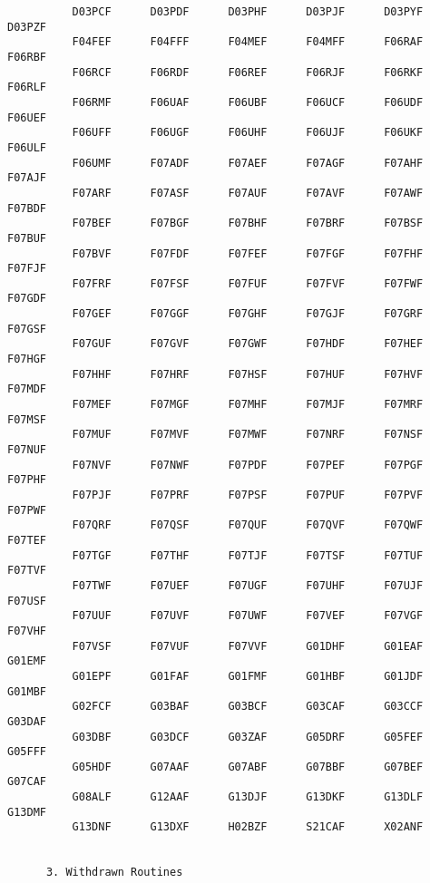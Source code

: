 \begin{small}
\begin{verbatim}
          D03PCF      D03PDF      D03PHF      D03PJF      D03PYF      D03PZF     
          F04FEF      F04FFF      F04MEF      F04MFF      F06RAF      F06RBF     
          F06RCF      F06RDF      F06REF      F06RJF      F06RKF      F06RLF     
          F06RMF      F06UAF      F06UBF      F06UCF      F06UDF      F06UEF     
          F06UFF      F06UGF      F06UHF      F06UJF      F06UKF      F06ULF     
          F06UMF      F07ADF      F07AEF      F07AGF      F07AHF      F07AJF     
          F07ARF      F07ASF      F07AUF      F07AVF      F07AWF      F07BDF     
          F07BEF      F07BGF      F07BHF      F07BRF      F07BSF      F07BUF     
          F07BVF      F07FDF      F07FEF      F07FGF      F07FHF      F07FJF     
          F07FRF      F07FSF      F07FUF      F07FVF      F07FWF      F07GDF     
          F07GEF      F07GGF      F07GHF      F07GJF      F07GRF      F07GSF     
          F07GUF      F07GVF      F07GWF      F07HDF      F07HEF      F07HGF     
          F07HHF      F07HRF      F07HSF      F07HUF      F07HVF      F07MDF     
          F07MEF      F07MGF      F07MHF      F07MJF      F07MRF      F07MSF     
          F07MUF      F07MVF      F07MWF      F07NRF      F07NSF      F07NUF     
          F07NVF      F07NWF      F07PDF      F07PEF      F07PGF      F07PHF     
          F07PJF      F07PRF      F07PSF      F07PUF      F07PVF      F07PWF     
          F07QRF      F07QSF      F07QUF      F07QVF      F07QWF      F07TEF     
          F07TGF      F07THF      F07TJF      F07TSF      F07TUF      F07TVF     
          F07TWF      F07UEF      F07UGF      F07UHF      F07UJF      F07USF     
          F07UUF      F07UVF      F07UWF      F07VEF      F07VGF      F07VHF     
          F07VSF      F07VUF      F07VVF      G01DHF      G01EAF      G01EMF     
          G01EPF      G01FAF      G01FMF      G01HBF      G01JDF      G01MBF     
          G02FCF      G03BAF      G03BCF      G03CAF      G03CCF      G03DAF     
          G03DBF      G03DCF      G03ZAF      G05DRF      G05FEF      G05FFF     
          G05HDF      G07AAF      G07ABF      G07BBF      G07BEF      G07CAF     
          G08ALF      G12AAF      G13DJF      G13DKF      G13DLF      G13DMF     
          G13DNF      G13DXF      H02BZF      S21CAF      X02ANF                 
                                                                                 
                                                                                 
      3. Withdrawn Routines                                                      
                                                                                 

\end{verbatim}
\end{small}

